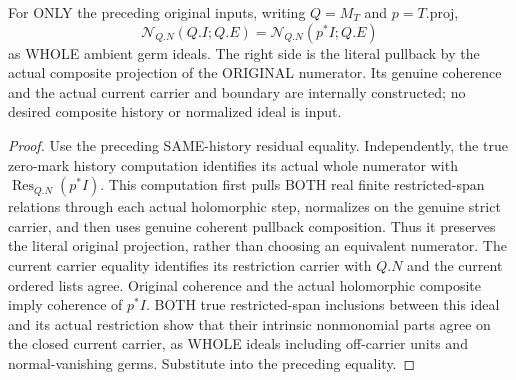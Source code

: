 \begin{theorem}
\label{hir:original-general-controlled-composite-total-whole-residual}
\leanok
For ONLY the preceding original inputs, writing $Q=M_T$ and $p=T.\mathrm{proj}$,
\[
 \mathcal N_{Q.N}(Q.I;Q.E)
 =\mathcal N_{Q.N}(p^*I;Q.E)
\]
as WHOLE ambient germ ideals. The right side is the literal pullback by
the actual composite projection of the ORIGINAL numerator. Its genuine
coherence and the actual current carrier and boundary are internally
constructed; no desired composite history or normalized ideal is input.
\end{theorem}
\begin{proof}
Use the preceding SAME-history residual equality. Independently, the true
zero-mark history computation identifies its actual whole numerator with
$\operatorname{Res}_{Q.N}(p^*I)$. This computation first pulls BOTH real
finite restricted-span relations through each actual holomorphic step,
normalizes on the genuine strict carrier, and then uses genuine coherent
pullback composition. Thus it preserves the literal original projection,
rather than choosing an equivalent numerator. The current carrier equality
identifies its restriction carrier with $Q.N$ and the current ordered lists
agree. Original coherence and the actual holomorphic composite imply
coherence of $p^*I$. BOTH true restricted-span inclusions between this ideal
and its actual restriction show that their intrinsic nonmonomial parts
agree on the closed current carrier, as WHOLE ideals including off-carrier
units and normal-vanishing germs. Substitute into the preceding equality.
\end{proof}

